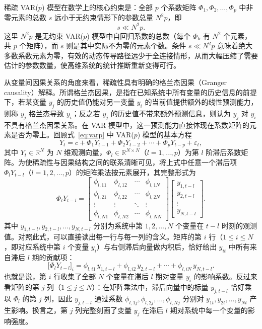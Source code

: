 稀疏 VAR($p$) 模型在数学上的核心约束是：全部 $p$ 个系数矩阵 $\Phi_1,\Phi_2,\dots,\Phi_p$ 中非零元素的总数 $s$ 远小于无约束情形下的参数总量 $N^2p$，即
\begin{equation}
s \ll N^2p.
\end{equation}
这里 $N^2p$ 是无约束 VAR($p$) 模型中自回归系数的总数（每个 $\Phi_k$ 有 $N^2$ 个元素，共 $p$ 个矩阵），而 $s$ 则是其中实际不为零的元素个数。条件 $s\ll N^2p$ 意味着绝大多数系数元素为零，有效的动态传导路径远少于全连接情形，从而大幅压缩了需要估计的参数数量，使高维系统的统计推断重新变得可行。

从变量间因果关系的角度来看，稀疏性具有明确的格兰杰因果（Granger causality）解释。所谓格兰杰因果，是指在已知系统中所有变量的历史信息的前提下，若某变量 $y_j$ 的历史值仍能对另一变量 $y_i$ 的当前值提供额外的线性预测能力，则称 $y_j$ 格兰杰导致 $y_i$；反之若 $y_j$ 的历史值不带来额外预测信息，则认为 $y_j$ 对 $y_i$ 不具有格兰杰因果关系。在 VAR 模型中，这一预测能力直接体现在系数矩阵的元素是否为零上。回顾式~\eqref{eq:varp} 中 VAR($p$) 模型的基本方程
\begin{equation}
Y_t = c + \Phi_1 Y_{t-1} + \Phi_2 Y_{t-2} + \cdots + \Phi_p Y_{t-p} + \varepsilon_t,
\end{equation}
其中 $Y_t\in\mathbb{R}^N$ 为 $N$ 维观测向量，$\Phi_l\in\mathbb{R}^{N\times N}$（$l=1,\dots,p$）为第 $l$ 阶滞后系数矩阵。为使稀疏性与因果结构之间的联系清晰可见，将上式中任意一个滞后项 $\Phi_l Y_{t-l}$（$l=1,2,\dots,p$）的矩阵乘法按元素展开，其完整形式为
\begin{equation}
\Phi_l Y_{t-l}
=
\begin{bmatrix}
\phi_{l,11} & \phi_{l,12} & \cdots & \phi_{l,1N}\\
\phi_{l,21} & \phi_{l,22} & \cdots & \phi_{l,2N}\\
\vdots & \vdots & \ddots & \vdots\\
\phi_{l,N1} & \phi_{l,N2} & \cdots & \phi_{l,NN}
\end{bmatrix}
\begin{bmatrix}
y_{1,t-l}\\
y_{2,t-l}\\
\vdots\\
y_{N,t-l}
\end{bmatrix}.
\end{equation}
其中 $y_{1,t-l},y_{2,t-l},\dots,y_{N,t-l}$ 分别为系统中第 $1,2,\dots,N$ 个变量在 $t-l$ 时刻的观测值。对照此式，可以直接读出每一行与每一列的含义。矩阵的第 $i$ 行（$1\leq i\leq N$，即对应系统中第 $i$ 个变量 $y_i$）与右侧滞后向量做内积后，恰好给出 $y_{it}$ 中所有来自滞后 $l$ 期的贡献项：
\begin{equation}
\bigl[\Phi_l Y_{t-l}\bigr]_i = \phi_{l,i1}\,y_{1,t-l} + \phi_{l,i2}\,y_{2,t-l} + \cdots + \phi_{l,iN}\,y_{N,t-l}.
\end{equation}
也就是说，第 $i$ 行收集了全部 $N$ 个变量在滞后 $l$ 期对变量 $y_i$ 的影响系数。反过来看矩阵的第 $j$ 列（$1\leq j\leq N$）：在矩阵乘法中，滞后向量中的标量 $y_{j,t-l}$ 恰好乘以 $\Phi_l$ 的第 $j$ 列，因此 $y_{j,t-l}$ 通过系数 $\phi_{l,1j},\phi_{l,2j},\dots,\phi_{l,Nj}$ 分别对 $y_{1t},y_{2t},\dots,y_{Nt}$ 产生影响。换言之，第 $j$ 列完整刻画了变量 $y_j$ 在滞后 $l$ 期对系统中每一个变量的影响强度。

